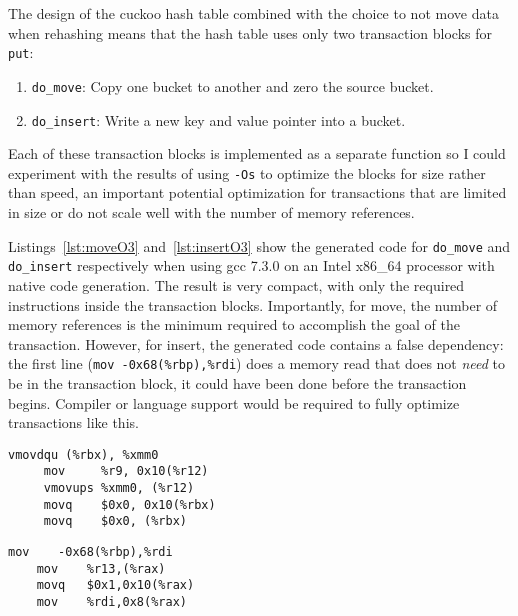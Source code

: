 The design of the cuckoo hash table combined with the choice to not move data
when rehashing means that the hash table uses only two transaction blocks for
\texttt{put}:
\begin{enumerate}
\item \texttt{do\_move}: Copy one bucket to another and zero the source bucket.
\item \texttt{do\_insert}: Write a new key and value pointer into a bucket.
\end{enumerate}
Each of these transaction blocks is implemented as a separate function so I
could experiment with the results of using \texttt{-Os} to optimize the blocks
for size rather than speed, an important potential optimization for
transactions that are limited in size or do not scale well with the number of
memory references.

Listings~\ref{lst:moveO3} and~\ref{lst:insertO3} show the generated code for
\texttt{do\_move} and \texttt{do\_insert} respectively when using gcc 7.3.0 on
an Intel x86\_64 processor with native code generation. The result is very
compact, with only the required instructions inside the transaction blocks.
Importantly, for move, the number of memory references is the minimum required to
accomplish the goal of the transaction. However, for insert, the generated code
contains a false dependency: the first line (\texttt{mov -0x68(\%rbp),\%rdi})
does a memory read that does not \textit{need} to be in the transaction block,
it could have been done before the transaction begins.
Compiler or language support would be required to fully optimize transactions
like this.


\begin{lstlisting}[caption={Transaction code generations for do\_move, optimized for speed.
Five instructions, five memory accesses (four writes).},label={lst:moveO3}]
     vmovdqu (%rbx), %xmm0
     mov     %r9, 0x10(%r12)
     vmovups %xmm0, (%r12)
     movq    $0x0, 0x10(%rbx)
     movq    $0x0, (%rbx)
\end{lstlisting}

\begin{lstlisting}[caption={Transaction code generation for do\_insert, optimized for speed.
Four instructions, four memory accesses (three writes).},label=lst:insertO3]
    mov    -0x68(%rbp),%rdi
    mov    %r13,(%rax)
    movq   $0x1,0x10(%rax)
    mov    %rdi,0x8(%rax)
\end{lstlisting}

